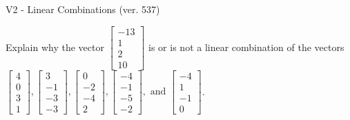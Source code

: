 \begin{exercise}
  \begin{exerciseTitle}V2 - Linear Combinations (ver. 537)\end{exerciseTitle}
  \begin{exerciseStatement}
    Explain why the vector \(\left[\begin{array}{c}
-13 \\
1 \\
2 \\
10
\end{array}\right]\)  is or is not a linear 
	combination of the vectors \(\left[\begin{array}{c}
4 \\
0 \\
3 \\
1
\end{array}\right] , \left[\begin{array}{c}
3 \\
-1 \\
-3 \\
-3
\end{array}\right] , \left[\begin{array}{c}
0 \\
-2 \\
-4 \\
2
\end{array}\right] , \left[\begin{array}{c}
-4 \\
-1 \\
-5 \\
-2
\end{array}\right] , \text{ and } \left[\begin{array}{c}
-4 \\
1 \\
-1 \\
0
\end{array}\right]\).
	



\end{exerciseStatement}
\end{exercise}
